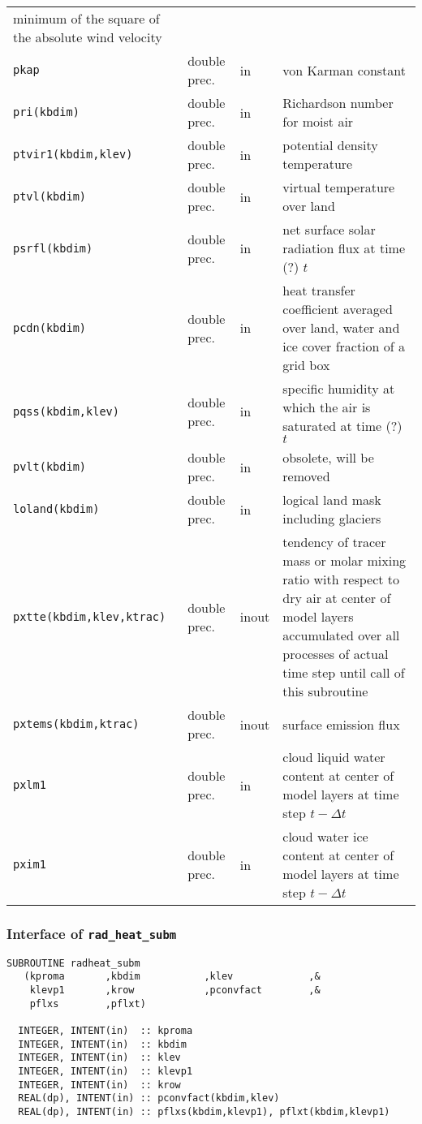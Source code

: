 \begin{longtable}{l@{\extracolsep\fill}llp{7.0cm}}
minimum of the square of the absolute wind velocity\\
{\tt pkap} & double prec. & in & von Karman constant\\
{\tt pri(kbdim)} & double prec. & in & Richardson number for moist air\\
{\tt ptvir1(kbdim,klev)} & double prec. & in & potential density temperature \\
{\tt ptvl(kbdim)} & double prec. & in & virtual temperature over land \\
{\tt psrfl(kbdim)} & double prec. & in & net surface solar radiation
flux at time (?) $t$ \\
{\tt pcdn(kbdim)} & double prec. & in & heat transfer coefficient averaged over land, water and ice cover fraction of a grid box \\
{\tt pqss(kbdim,klev)} & double prec. & in  & specific humidity at
which the air is saturated at time (?) $t$ \\
{\tt pvlt(kbdim)} & double prec. & in & obsolete, will be removed \\
{\tt loland(kbdim)} & double prec. & in & logical land mask including
glaciers \\
{\tt pxtte(kbdim,klev,ktrac)} & double prec. & inout & tendency of tracer
mass or molar mixing ratio with respect to dry air at center of model
layers accumulated over all processes of actual time
step until call of this subroutine \\
{\tt pxtems(kbdim,ktrac)} & double prec. & inout & surface emission
flux \\
{\tt pxlm1} & double prec. & in & cloud liquid water content at center
of model layers at time step $t-\Delta t$ \\
{\tt pxim1} & double prec. & in & cloud water ice content at center
of model layers at time step $t-\Delta t$ \\
\end{longtable}





\subsubsection{Interface of {\tt rad\_heat\_subm}}

\begin{lstlisting}[caption=rad\_heat\_subm]
SUBROUTINE radheat_subm
   (kproma       ,kbdim           ,klev             ,&
    klevp1       ,krow            ,pconvfact        ,&
    pflxs        ,pflxt)

  INTEGER, INTENT(in)  :: kproma     
  INTEGER, INTENT(in)  :: kbdim      
  INTEGER, INTENT(in)  :: klev       
  INTEGER, INTENT(in)  :: klevp1     
  INTEGER, INTENT(in)  :: krow       
  REAL(dp), INTENT(in) :: pconvfact(kbdim,klev) 
  REAL(dp), INTENT(in) :: pflxs(kbdim,klevp1), pflxt(kbdim,klevp1) 
\end{lstlisting}

